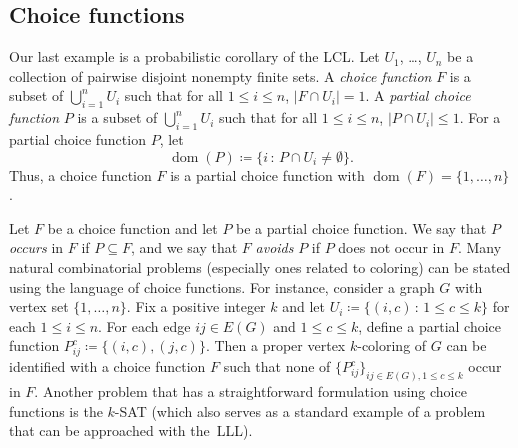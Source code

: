 \documentclass[10pt]{article}
\numberwithin{equation}{subsection}
\theoremstyle{definition}
\begin{document}
	
		
	\subsection{Choice functions}\label{subsec:choice}
	
	Our last example is a probabilistic corollary of the LCL. Let $U_1$, \ldots, $U_n$ be a collection of pairwise disjoint nonempty finite sets. A \emph{choice function} $F$ is a subset of $\bigcup_{i=1}^n U_i$ such that for all $1 \leq i \leq n$, $|F \cap U_i| = 1$. A \emph{partial choice function} $P$ is a subset of $\bigcup_{i=1}^n U_i$ such that for all $1 \leq i \leq n$, $|P \cap U_i| \leq 1$. For a partial choice function $P$, let
	$$
	\operatorname{dom}(P) \coloneqq \{i \,:\, P \cap U_i \neq \emptyset\}. 
	$$
	Thus, a choice function $F$ is a partial choice function with $\operatorname{dom}(F) = \{1, \ldots, n\}$.
	
	Let $F$ be a choice function and let $P$ be a partial choice function. We say that $P$ \emph{occurs} in $F$ if $P \subseteq F$, and we say that $F$ \emph{avoids} $P$ if $P$ does not occur in $F$. Many natural combinatorial problems (especially ones related to coloring) can be stated using the language of choice functions. For instance, consider a graph $G$ with vertex set $\{1, \ldots, n\}$. Fix a positive integer $k$ and let $U_i \coloneqq \{(i, c)\,:\, 1 \leq c \leq k\}$ for each $1 \leq i \leq n$. For each edge $ij \in E(G)$ and $1 \leq c \leq k$, define a partial choice function $P^c_{ij} \coloneqq \{(i, c), (j, c)\}$. Then a proper vertex $k$-coloring of $G$ can be identified with a choice function $F$ such that none of $\{P^c_{ij}\}_{ij \in E(G), 1\leq c \leq k}$ occur in $F$. Another problem that has a straightforward formulation using choice functions is the $k$-SAT (which also serves as a standard example of a problem that can be approached with the~LLL).
	
\end{document}
